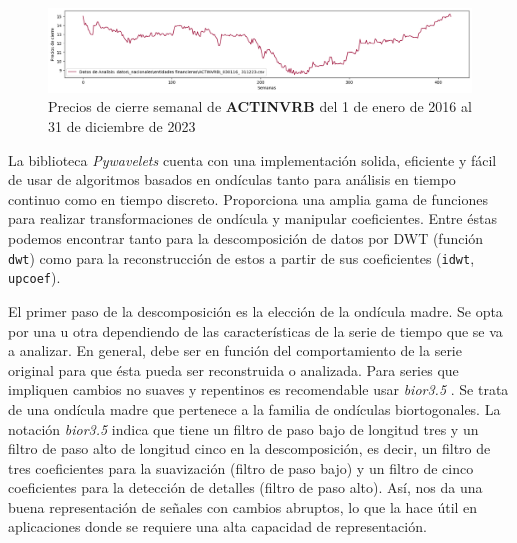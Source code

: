 \begin{figure}[h]
    \centering
    \includegraphics[width=1\textwidth]{Figuras/construccion_del_modelo/ACTINVR_030116_311223.png}
    \caption{Precios de cierre semanal de \textbf{ACTINVRB} del 1 de enero de 2016 al 31 de diciembre de 2023} 
    \label{fig:ACTINVRB}
\end{figure}

La biblioteca \textit{Pywavelets} \cite{pywavelets} cuenta con una implementación solida, eficiente y fácil de usar de algoritmos basados en ondículas tanto para análisis en tiempo continuo como en tiempo discreto. Proporciona una amplia gama de funciones para realizar transformaciones de ondícula y manipular coeficientes. Entre éstas podemos encontrar tanto para la descomposición de datos por DWT (función \texttt{dwt}) %
 como para la reconstrucción de estos a partir de sus coeficientes (\texttt{idwt}, \texttt{upcoef}).

El primer paso de la descomposición es la elección de la ondícula madre. Se opta por una u otra dependiendo de las características de la serie de tiempo que se va a analizar. En general, debe ser en función del comportamiento de la serie original para que ésta pueda ser reconstruida o analizada. Para series que impliquen cambios no suaves y repentinos es recomendable usar \textit{bior3.5} \cite{DWT-NARNN}. Se trata de una ondícula madre que pertenece a la familia de ondículas biortogonales. La notación \textit{bior3.5} indica que tiene un filtro de paso bajo de longitud tres y un filtro de paso alto de longitud cinco en la descomposición, es decir, un filtro de tres coeficientes para la suavización (filtro de paso bajo) y un filtro de cinco coeficientes para la detección de detalles (filtro de paso alto). Así, nos da una buena representación de señales con cambios abruptos, lo que la hace útil en aplicaciones donde se requiere una alta capacidad de representación.

